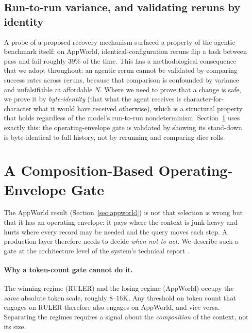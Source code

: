 \documentclass[11pt]{article}
\begin{document}
\subsection{Run-to-run variance, and validating reruns by identity}
\label{sec:variance}

A probe of a proposed recovery mechanism surfaced a property of the agentic benchmark itself: on
AppWorld, identical-configuration reruns flip a task between pass and fail roughly $39\%$ of the
time. This has a methodological consequence that we adopt throughout: an agentic rerun cannot be
validated by comparing success rates across reruns, because that comparison is confounded by
variance and unfalsifiable at affordable $N$. Where we need to prove that a change is safe, we
prove it by \emph{byte-identity} (that what the agent receives is character-for-character what
it would have received otherwise), which is a structural property that holds regardless of the
model's run-to-run nondeterminism. Section~\ref{sec:gate} uses exactly this: the operating-envelope
gate is validated by showing its stand-down is byte-identical to full history, not by rerunning and
comparing dice rolls.

\section{A Composition-Based Operating-Envelope Gate}
\label{sec:gate}

The AppWorld result (Section~\ref{sec:appworld}) is not that selection is wrong but that it has an
operating envelope: it pays where the context is junk-heavy and hurts where every record may be
needed and the query moves each step. A production layer therefore needs to decide \emph{when not
to act}. We describe such a gate at the architecture level of the system's technical report
\citep{rao2026needlepath}.

\paragraph{Why a token-count gate cannot do it.} The winning regime (RULER) and the losing regime
(AppWorld) occupy the \emph{same} absolute token scale, roughly $8$--$16$K. Any threshold on
token count that engages on RULER therefore also engages on AppWorld, and vice versa. Separating
the regimes requires a signal about the \emph{composition} of the context, not its size.
\end{document}
